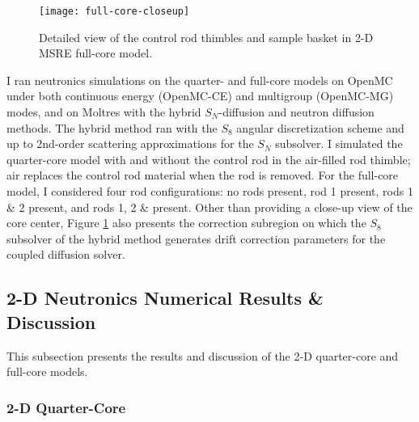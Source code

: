 \begin{figure}[htb!]
  \centering
  \texttt{[image: full-core-closeup]}
  \caption{Detailed view of the control rod thimbles and sample basket in 2-D \gls{MSRE} full-core
    model.}
  \label{fig:full-geom-closeup}
\end{figure}

I ran neutronics simulations on the quarter- and full-core models on OpenMC under both continuous
energy (OpenMC-CE) and multigroup (OpenMC-MG) modes, and on Moltres with the hybrid $S_N$-diffusion
and neutron diffusion methods. The hybrid method ran with the $S_8$ angular discretization scheme
and up to 2nd-order scattering approximations for the $S_N$ subsolver. I simulated the
quarter-core model with and without the control rod in the air-filled rod thimble; air replaces the
control rod material when the rod is removed. For the full-core model, I considered four rod
configurations: no rods present, rod 1 present, rods 1 \& 2 present, and rods 1, 2 \& present.
Other than providing a close-up view of the core center, Figure \ref{fig:full-geom-closeup} also
presents the correction subregion on which the $S_8$ subsolver of the hybrid method generates
drift correction parameters for the coupled diffusion solver.

\FloatBarrier

\subsection{2-D Neutronics Numerical Results \& Discussion} \label{sec:2d-nts-results}

This subsection presents the results and discussion of the 2-D quarter-core and full-core models.

\subsubsection{2-D Quarter-Core}


